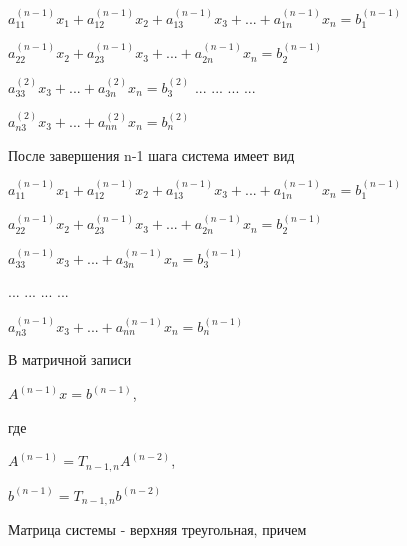 \begin{math}
	a_{11}^{(n-1)}x_{1}+a_{12}^{(n-1)}x_{2}+a_{13}^{(n-1)}x_{3}+...+a_{1n}^{(n-1)}x_{n}=b_{1}^{(n-1)}
\end{math}

 \begin{math}
 	a_{22}^{(n-1)}x_{2}+a_{23}^{(n-1)}x_{3}+...+a_{2n}^{(n-1)}x_{n}=b_{2}^{(n-1)}
 \end{math}

\begin{math}
	a_{33}^{(2)}x_{3}+...+a_{3n}^{(2)}x_{n}=b_{3}^{(2)}
\end{math}
... ... ... ...

\begin{math}
	a_{n3}^{(2)}x_{3}+...+a_{nn}^{(2)}x_{n}=b_{n}^{(2)}
\end{math}
 
После завершения n-1 шага система имеет вид 

\begin{math}
	a_{11}^{(n-1)}x_{1}+a_{12}^{(n-1)}x_{2}+a_{13}^{(n-1)}x_{3}+...+a_{1n}^{(n-1)}x_{n}=b_{1}^{(n-1)}
\end{math}

\begin{math}
	a_{22}^{(n-1)}x_{2}+a_{23}^{(n-1)}x_{3}+...+a_{2n}^{(n-1)}x_{n}=b_{2}^{(n-1)}
\end{math}

\begin{math}
	a_{33}^{(n-1)}x_{3}+...+a_{3n}^{(n-1)}x_{n}=b_{3}^{(n-1)}
\end{math}

... ... ... ...

\begin{math}
	a_{n3}^{(n-1)}x_{3}+...+a_{nn}^{(n-1)}x_{n}=b_{n}^{(n-1)}
\end{math}
 
В матричной записи 
 
\begin{math}
	A^{(n-1)}x=b^{(n-1)}
\end{math}, 

где 

\begin{math}
	A^{(n-1)}=T_{n-1,n}A^{(n-2)}
\end{math},

\begin{math}
	b^{(n-1)}=T_{n-1,n}b^{(n-2)}
\end{math}

Матрица системы - верхняя треугольная, причем 

